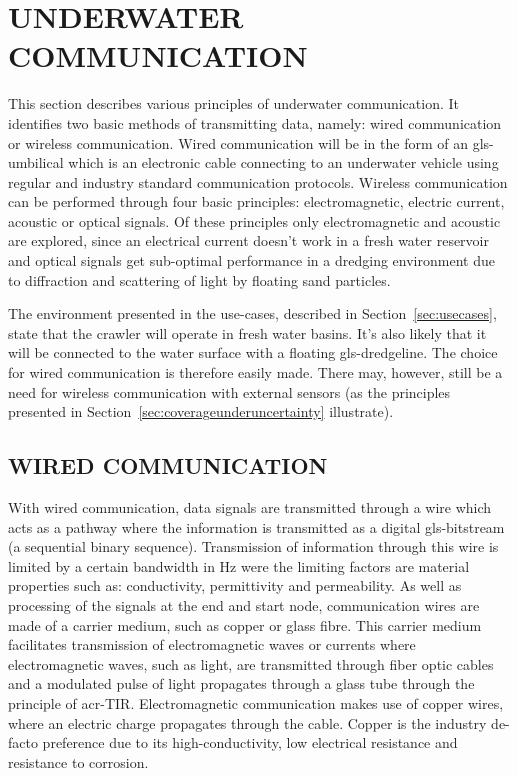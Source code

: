 

\section{UNDERWATER COMMUNICATION}\label{sec:underwater_communication}
This section describes various principles of underwater communication. It identifies two basic methods of
transmitting data, namely: wired communication or wireless communication. Wired communication will be in the form of
an \gls{gls-umbilical} which is an electronic cable connecting to an underwater vehicle using regular and industry
standard communication protocols. Wireless communication can be performed through four basic principles:
electromagnetic, electric current, acoustic or optical signals. Of these principles only electromagnetic and acoustic
are explored, since an electrical current doesn't work in a fresh water reservoir and optical signals get sub-optimal
performance in a dredging environment due to diffraction and scattering of light by floating sand particles.

The environment presented in the use-cases, described in Section~\ref{sec:usecases}, state that the crawler will 
operate in fresh water basins. It's also likely that it will be connected to the water surface with a floating 
\gls{gls-dredgeline}. The choice for wired communication is therefore easily made. There may, however, still be a 
need for wireless communication with external sensors (as the principles presented in 
Section~\ref{sec:coverageunderuncertainty} illustrate).

\subsection{WIRED COMMUNICATION}\label{sec:wired communication}
With wired communication, data signals are transmitted through a wire which acts as a pathway where the information 
is transmitted as a digital \gls{gls-bitstream} (a sequential binary sequence). Transmission of information through 
this wire is limited by a certain bandwidth in \si{\hertz} were the limiting factors are material properties such as:
conductivity, permittivity and permeability. As well as processing of the signals at the end and start node, 
communication wires are made of a carrier medium, such as copper or glass fibre. This carrier medium facilitates 
transmission of electromagnetic waves or currents where electromagnetic waves, such as light, are transmitted through
fiber optic cables and a modulated pulse of light propagates through a glass tube through the principle of 
\gls{acr-TIR}. Electromagnetic communication makes use of copper wires, where an electric charge propagates through 
the cable. Copper is the industry de-facto preference due to its high-conductivity, low electrical resistance and 
resistance to corrosion.

